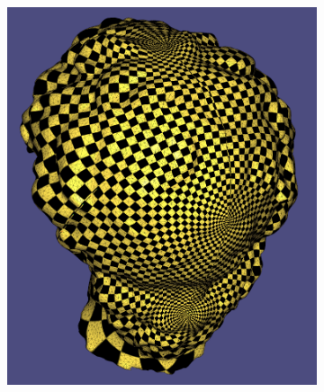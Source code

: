 \begin{figure}
\begin{subfigure}{0.3\textwidth}
\caption{}
\end{subfigure}\ \ \ \ \ \ \ \ \ \ \ 
\begin{subfigure}{0.3\textwidth}
\includegraphics[height=\textwidth]{images/david_euc_texture}
\caption{}
\label{fig:orbifold_conformal}
\end{subfigure}


\end{figure}
